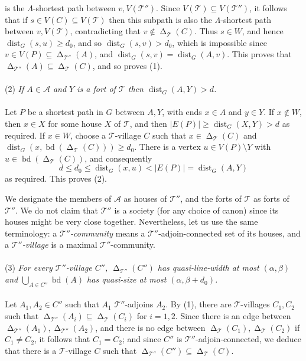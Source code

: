 \documentclass[titlepage,11pt]{article}
\newcommand{\dist}{\operatorname{dist}}
\newcommand{\voro}{\operatorname{\Delta}}
\newcommand{\bd}{\operatorname{bd}}
\newcommand{\mac}{\mathcal}
\begin{document}
	is the $\Lambda$-shortest path between $v, V(\mac T'')$. Since $V(\mac T)\subseteq V(\mac T'')$, it follows that if 
	$s\in V(C)\subseteq V(\mac T)$ then this subpath is also the $\Lambda$-shortest path between $v, V(\mac T)$, contradicting that $v\notin \voro_{\mac T}(C)$.
	Thus $s\in W$, and hence $\dist_G(s,u)\ge d_0$, and so $\dist_G(s,v)>d_0$, which is impossible since 
	$v\in V(P)\subseteq \voro_{\mac T''}(A)$, and $\dist_G(s,v) = \dist_G(A,v)$. This proves that $\voro_{\mac T''}(A)\subseteq \voro_{\mac T}(C)$, and so proves (1).
	\\
	\\
	(2) {\em If $A\in \mac A$ and $Y$ is a fort of $\mac T$ then $\dist_G(A,Y)>d$.}
	\\
	\\
	Let $P$ be a shortest path in
	$G$ between $A,Y$, with ends $x\in A$ and $y\in Y$.
	If $x\notin W$, then $x\in X$ for some house $X$ of $\mac T$, and then $|E(P)|\ge \dist_G(X,Y)>d$ as required. 
	If $x\in W$, choose a $\mac T$-village $C$ such that $x\in \voro_{\mac T}(C)$ and
	$\dist_G(x,\bd(\voro_{\mac T}(C)))\ge d_0$. There is a vertex $u\in V(P)\setminus Y$ with $u\in \bd (\voro_{\mac T}(C))$,
	and consequently 
	$$d\le d_0\le \dist_G(x,u)<|E(P)|=\dist_G(A,Y)$$
	as required. This proves (2).
	
	\bigskip
	
	We designate the members of $\mac A$ as houses of $\mac T''$, and the forts of $\mac T$ as forts of $\mac T''$. We do not claim that $\mac T''$ is a society (for any choice of canon)
	since its houses might be very close together. Nevertheless, let us use the same terminology: a {\em $\mac T''$-community} means a $\mac T''$-adjoin-connected set of its houses, and a {\em $\mac T''$-village} is a maximal $\mac T''$-community.
	\\
	\\
	(3) {\em For every $\mac T''$-village $C''$, 
		$\voro_{\mac T''}(C'')$ has quasi-line-width at most $(\alpha,\beta)$ and
		$\bigcup_{A\in C''}\bd (A)$ has quasi-size at most $(\alpha,\beta+d_0)$.}
	\\
	\\
	Let $A_1,A_2\in C''$ such that $A_1$ $\mac T''$-adjoins $A_2$.
	By (1), there are $\mac T$-villages $C_1,C_2$ such that $\voro_{\mac T''}(A_i)\subseteq \voro_{\mac T}(C_i)$ for $i = 1,2$.
	Since there is an edge between $\voro_{\mac T''}(A_1),\voro_{\mac T''}(A_2)$, and there is no edge between
	$\voro_{\mac T}(C_1),\voro_{\mac T}(C_2)$ if $C_1\ne C_2$, it follows that $C_1=C_2$; and since $C''$ is $\mac T''$-adjoin-connected, we deduce 
	that there is a $\mac T$-village $C$ such that  $\voro_{\mac T''}(C'')\subseteq \voro_{\mac T}(C)$.
	
\end{document}
